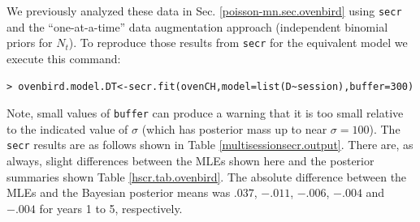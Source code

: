 We previously analyzed these data in
Sec. \ref{poisson-mn.sec.ovenbird} using \mbox{\tt secr} and the
``one-at-a-time'' data augmentation approach (independent binomial
priors for $N_{t}$).  To reproduce those results from \mbox{\tt secr}
for the equivalent model we execute this command:
\begin{verbatim}
> ovenbird.model.DT<-secr.fit(ovenCH,model=list(D~session),buffer=300)
\end{verbatim}
Note, small values of \mbox{\tt buffer} can produce a warning that it
is too small relative to the indicated value of $\sigma$ (which has
posterior mass up to near $\sigma = 100$).  The \mbox{\tt secr}
results are as follows shown in Table
\ref{multisessionsecr.output}.
There are, as always, slight
differences between the MLEs shown here and the posterior summaries
shown Table \ref{hscr.tab.ovenbird}.
The absolute difference between the MLEs and the Bayesian posterior
means was $.037$,  $-.011$,  $-.006$,  $-.004$ and $-.004$ for years 1
to 5, respectively. 

